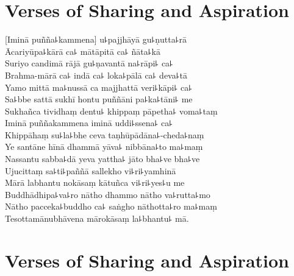 
\chapter[Sharing and Aspiration]{Verses of Sharing and Aspiration}%

\begin{leader}
\end{leader}

[Iminā puñña꜕kammena] u꜕pajjhāyā gu꜕ṇutta꜕rā\\
Ācariyūpa꜕kārā ca꜕ mātāpitā ca꜕ ñāta꜕kā\\
Suriyo candimā rājā gu꜕ṇavantā na꜕rāpi꜕ ca꜕\\
Brahma-mārā ca꜕ indā ca꜕ loka꜕pālā ca꜕ deva꜕tā\\
Yamo mittā ma꜕nussā ca majjhattā veri꜕kāpi꜕ ca꜕\\
Sa꜕bbe sattā sukhī hontu puññāni pa꜕ka꜕tāni꜕ me\\
Sukhañca tividhaṃ dentu꜕ khippaṃ pāpetha꜕ voma꜕taṃ\\
Iminā puññakammena iminā uddi꜕ssena꜕ ca꜕\\
Khippāhaṃ su꜕la꜕bhe ceva taṇhūpādāna꜕-cheda꜕naṃ\\
Ye santāne hīnā dhammā yāva꜕ nibbāna꜕to ma꜕maṃ\\
Nassantu sabba꜕dā yeva yattha꜕ jāto bha꜕ve bha꜕ve\\
Ujucittaṃ sa꜕ti꜕paññā sallekho vi꜕ri꜕yamhinā\\
Mārā labhantu nokāsaṃ kātuñca vi꜕ri꜕yes꜕u me\\
Buddhādhipa꜕va꜕ro nātho dhammo nātho va꜕rutta꜕mo\\
Nātho pacceka꜕buddho ca꜕ saṅgho nāthotta꜕ro ma꜕maṃ\\
Tesottamānubhāvena mārokāsaṃ la꜕bhantu꜕ mā.

\chapter[Sharing and Aspiration]{Verses of Sharing and Aspiration}%

\begin{leader}
\end{leader}

